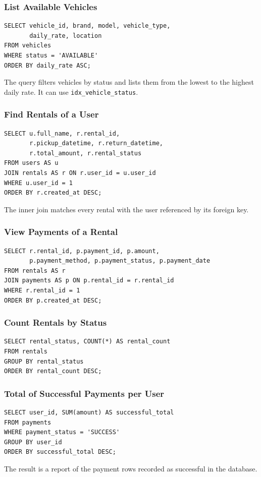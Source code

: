 \documentclass[10pt,a4paper]{report}
\newcommand{\col}[1]{\texttt{#1}}
\begin{document}
\subsubsection{List Available Vehicles}
\begin{lstlisting}[caption={Filtering and sorting vehicles},label={lst:q1}]
SELECT vehicle_id, brand, model, vehicle_type,
       daily_rate, location
FROM vehicles
WHERE status = 'AVAILABLE'
ORDER BY daily_rate ASC;
\end{lstlisting}
The query filters vehicles by status and lists them from the lowest to the highest daily rate. It can use \col{idx_vehicle_status}.

\subsubsection{Find Rentals of a User}
\begin{lstlisting}[caption={Joining users and rentals},label={lst:q2}]
SELECT u.full_name, r.rental_id,
       r.pickup_datetime, r.return_datetime,
       r.total_amount, r.rental_status
FROM users AS u
JOIN rentals AS r ON r.user_id = u.user_id
WHERE u.user_id = 1
ORDER BY r.created_at DESC;
\end{lstlisting}
The inner join matches every rental with the user referenced by its foreign key.

\subsubsection{View Payments of a Rental}
\begin{lstlisting}[caption={Joining rentals and payments},label={lst:q3}]
SELECT r.rental_id, p.payment_id, p.amount,
       p.payment_method, p.payment_status, p.payment_date
FROM rentals AS r
JOIN payments AS p ON p.rental_id = r.rental_id
WHERE r.rental_id = 1
ORDER BY p.created_at DESC;
\end{lstlisting}

\subsubsection{Count Rentals by Status}
\begin{lstlisting}[caption={Aggregation with GROUP BY},label={lst:q4}]
SELECT rental_status, COUNT(*) AS rental_count
FROM rentals
GROUP BY rental_status
ORDER BY rental_count DESC;
\end{lstlisting}

\subsubsection{Total of Successful Payments per User}
\begin{lstlisting}[caption={SUM with a status filter},label={lst:q5}]
SELECT user_id, SUM(amount) AS successful_total
FROM payments
WHERE payment_status = 'SUCCESS'
GROUP BY user_id
ORDER BY successful_total DESC;
\end{lstlisting}
The result is a report of the payment rows recorded as successful in the database.
\end{document}
